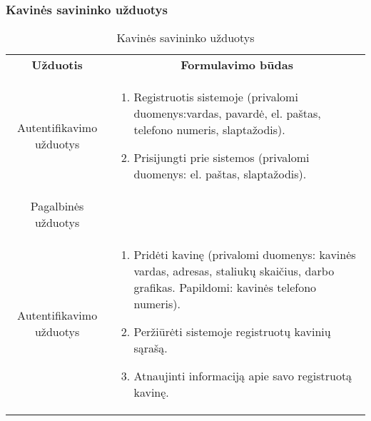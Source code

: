 \documentclass{VUMIFPSkursinis}
\begin{document}
\subsubsection{Kavinės savininko užduotys}
\begin{center}
	\begin{table}[H]
	\begin{tabular}{|p{2cm}|p{16cm}|}
	\hline
	    \rowcolor{lightgray}
		\multicolumn{2}{|c|}{Kavinės savininko užduotys}\\
		
	\hline
		\multicolumn{1}{|c|}{{\bfseries Užduotis}}&
		\multicolumn{1}{|c|}{{\bfseries Formulavimo būdas}}\\		
	\hline 	
		\multicolumn{1}{|c|}{Autentifikavimo užduotys}&
		\multicolumn{1}{|p{11,6cm}|}{
			\begin{enumerate}
				\item Registruotis sistemoje (privalomi duomenys:vardas, pavardė, el. paštas, telefono numeris, slaptažodis).
				\item Prisijungti prie sistemos (privalomi duomenys: el. paštas, slaptažodis).
			\end{enumerate}}\\
	\hline
		\multicolumn{1}{|c|}{Pagalbinės užduotys}\\
		

	\hline 	
		\multicolumn{1}{|c|}{Autentifikavimo užduotys}&
		\multicolumn{1}{|p{11,6cm}|}{
			\begin{enumerate}
				\item Pridėti kavinę (privalomi duomenys: kavinės vardas, adresas, staliukų skaičius, darbo grafikas. Papildomi: kavinės telefono numeris).
				\item Peržiūrėti sistemoje registruotų kavinių sąrašą.
				\item Atnaujinti informaciją apie savo registruotą kavinę.
			\end{enumerate}}\\
	
	\hline 	 	
	\end{tabular}
	\caption{Kavinės savininko užduotys}
	\label{table:2}
	\end{table}

\end{center}
\end{document}
